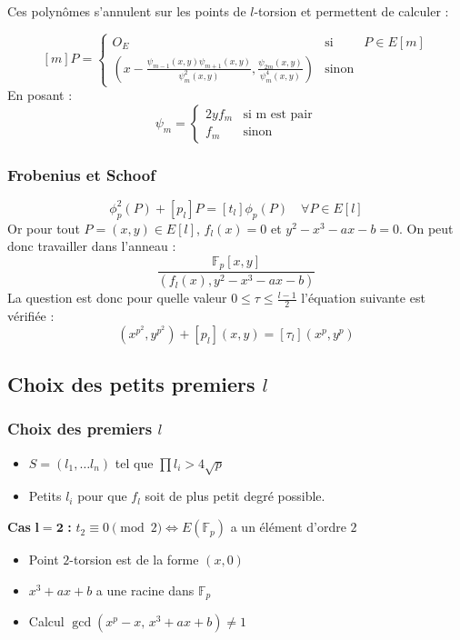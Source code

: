 \documentclass[french]{beamer}
\begin{document}
\begin{frame}
Ces polynômes s'annulent sur les points de $l$-torsion et permettent de calculer :

\begin{equation*}\label{mP}
[m]P = \left\lbrace
\begin{array}{lll}
O_E & \mbox{si} & P \in E[m]  \\
\left(  x -   \frac{\psi_{m-1}(x,y)\psi_{m+1}(x,y)}{\psi^2_m(x,y)}, \frac{\psi_{2m}(x,y)}{\psi^4_m(x,y)}\right) & \mbox{sinon}  & 
\end{array}\right.
\end{equation*}
En posant : 
\begin{equation*}
\psi_m= \left\lbrace
\begin{array}{cc}
2yf_m & \mbox{si m est pair} \\
f_m & \mbox{sinon}
\end{array}\right.
\end{equation*} 
\end{frame}


\begin{frame}
\frametitle{Frobenius et Schoof}
\begin{equation*}
\label{eqnfrobenius}
\phi_p^2(P)  + [p_l]P = [t_{l}] \phi_p(P) \quad \forall P \in E[l]
\end{equation*} 
Or pour tout $P=(x,y) \in E[l]$, $f_l(x) = 0$ et $y^2 - x^3 -ax -b=0$. 
\newline
On peut donc travailler dans l'anneau : 
$$ \frac{\mathbb{F}_p[x,y]}{(f_l(x), y^2 - x^3 -ax -b)} $$ 
La question est donc pour quelle valeur $0 \leq \tau \leq \frac{l-1}{2}$ l'équation suivante est vérifiée :
\begin{equation*}
(x^{p^2}, y^{p^2}) + [p_l](x,y) = [\tau_l](x^{p}, y^{p})
\end{equation*}
\end{frame}

\subsection{Choix des petits premiers $l$}
\begin{frame}
\frametitle{Choix des premiers $l$}
\begin{itemize}
\item $S = (l_1, \ldots l_n)$ tel que $\prod l_i > 4\sqrt{p}$
\item Petits $l_i$ pour que $f_l$ soit de plus petit degré possible.
\end{itemize}

 
\textbf{Cas} $\mathbf{l=2}$ \textbf{:} $t_2 \equiv 0 \pmod 2 \Leftrightarrow E(\mathbb{F}_p)$ a un élément d'ordre $2$
\begin{itemize}
\item Point $2$-torsion est de la forme $(x,0)$
\item $x^3 +ax +b$ a une racine dans $\mathbb{F}_p$
\item Calcul $\gcd(x^p - x,\, x^3 +ax +b) \ne 1$
\end{itemize}
\end{frame}
\end{document}
